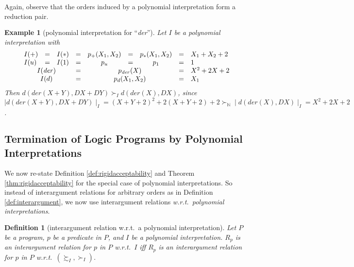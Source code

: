\documentclass[envcountsame]{tlp}
\newcounter{ex:der-lastsymconsctr}
\newtheorem{definition}{Definition}
\newtheorem{example}{Example}
\begin{document}
Again, observe that the orders induced by a polynomial interpretation form a reduction pair.






\begin{example}[polynomial interpretation for ``\textit{der}'']\label{exam:dist}
Let $I$ be a polynomial interpretation with 
\[\begin{array}{llllclcll}
I(+) &=& I(*) &=&
p_{+}(X_1,X_2) &=&
p_{*}(X_1,X_2)&=& X_1 + X_2 + 2\\
I(u) &=& I(1)& =& p_u &=& p_1 &=& 1\\
\multicolumn{3}{c}{I(\mathit{der})} &=&
\multicolumn{3}{c}{p_{\mathit{der}}(X)} &=& X^2 + 2 X + 2\\
\multicolumn{3}{c}{I(d)}&=&\multicolumn{3}{c}{p_d(X_1,X_2)} &=& X_1
\end{array}\]
Then $d(\mathit{der}(X+Y), DX + DY) \succ_I d(\mathit{der}(X), DX)$, since
${\mid}d(\mathit{der}(X+Y), DX + DY){\mid}_I =  (X+Y+2)^2 + 2 (X + Y + 2) + 2
\succ_{\mathbb{N}} {\mid}d(\mathit{der}(X), DX){\mid}_I =  X^2 + 2 X + 2$.
\end{example}






\subsection{Termination of Logic Programs by Polynomial Interpretations}
\label{Termination poly_interpretation}















We now re-state Definition \ref{def:rigidacceptability} and Theorem
\ref{thm:rigidacceptability} for the special case of 
polynomial interpretations.
So instead of interargument relations for arbitrary orders as in Definition
\ref{def:interargument}, 
we now use
interargument relations \emph{w.r.t.\ polynomial interpretations}.

\begin{definition}[interargument relation w.r.t.\ a polynomial interpretation]
\label{def:polynomialinterargumentrelation}
Let $P$ be a program, $p$ be a
predicate in $P$, and $I$ be a polynomial interpretation. 
$R_{p}$ is an \emph{interargument relation}  for $p$ in $P$ w.r.t.\
$I$
iff $R_p$ is an interargument relation  for $p$ in $P$ w.r.t.\
$(\succsim_I,\succ_I)$.
\end{definition}
\end{document}
